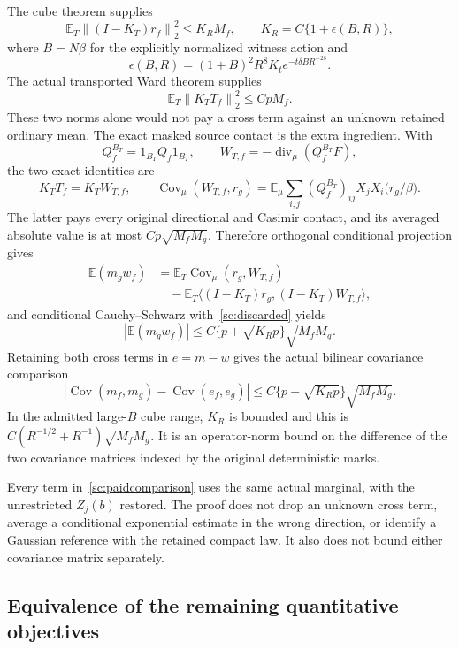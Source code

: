 \documentclass[11pt]{article}
\theoremstyle{definition}\newtheorem{definition}[theorem]{Definition}
\theoremstyle{remark}\newtheorem{remark}[theorem]{Remark}
\newcommand{\E}{\mathbb E}\newcommand{\Var}{\operatorname{Var}}
\newcommand{\Cov}{\operatorname{Cov}}\newcommand{\Tr}{\operatorname{Tr}}
\newcommand{\norm}[1]{\left\lVert #1\right\rVert}
\newcommand{\inner}[2]{\langle #1,#2\rangle}
\providecommand{\diver}{\operatorname{div}}
\begin{document}
The cube theorem supplies
\begin{equation}
 \E_T\norm{(I-K_T)r_f}_2^2\le K_RM_f,\qquad
 K_R=C\{1+\epsilon(B,R)\},
 \label{sc:discarded}
\end{equation}
where \(B=N\beta\) for the explicitly normalized witness action and
\[
 \epsilon(B,R)=(1+B)^2R^8K_t e^{-t\delta BR^{-28}} .
\]
The actual transported Ward theorem supplies
\[
 \E_T\norm{K_TT_f}_2^2\le CpM_f .
\]
These two norms alone would not pay a cross term against an unknown retained ordinary mean. The exact masked source contact is the extra ingredient. With
\[
 Q_f^{B_T}=1_{B_T}Q_f1_{B_T},\qquad
 W_{T,f}=-\diver_\mu(Q_f^{B_T}F),
\]
the two exact identities are
\[
 K_TT_f=K_TW_{T,f},\qquad
 \Cov_\mu(W_{T,f},r_g)
   =\E_\mu\sum_{i,j}(Q_f^{B_T})_{ij}
           X_jX_i\bigl(r_g/\beta\bigr).
\]
The latter pays every original directional and Casimir contact, and its averaged absolute value is at most \(Cp\sqrt{M_fM_g}\). Therefore orthogonal conditional projection gives
\begin{align*}
 \E(m_gw_f)
 &=\E_T\Cov_\mu(r_g,W_{T,f})\\
 &\quad-\E_T\inner{(I-K_T)r_g}{(I-K_T)W_{T,f}},
\end{align*}
and conditional Cauchy--Schwarz with~\eqref{sc:discarded} yields
\begin{equation}
 |\E(m_gw_f)|
 \le C\{p+\sqrt{K_Rp}\}\sqrt{M_fM_g}.
 \label{sc:paidcross}
\end{equation}
Retaining both cross terms in \(e=m-w\) gives the actual bilinear covariance comparison
\begin{equation}
 \boxed{\left|\Cov(m_f,m_g)-\Cov(e_f,e_g)\right|
   \le C\{p+\sqrt{K_Rp}\}\sqrt{M_fM_g}.}
 \label{sc:paidcomparison}
\end{equation}
In the admitted large-\(B\) cube range, \(K_R\) is bounded and this is
\(C(R^{-1/2}+R^{-1})\sqrt{M_fM_g}\). It is an operator-norm bound on the difference of the two covariance matrices indexed by the original deterministic marks.

Every term in~\eqref{sc:paidcomparison} uses the same actual marginal, with the unrestricted \(Z_j(b)\) restored. The proof does not drop an unknown cross term, average a conditional exponential estimate in the wrong direction, or identify a Gaussian reference with the retained compact law. It also does not bound either covariance matrix separately.

\subsection{Equivalence of the remaining quantitative objectives}
\end{document}
